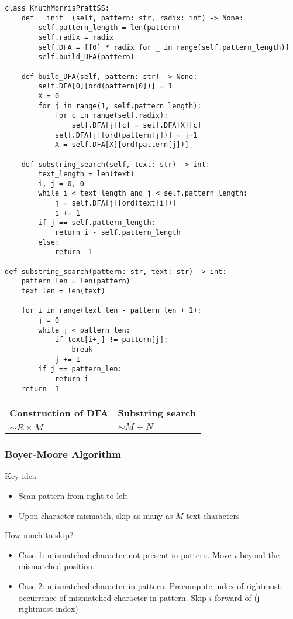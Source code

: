\documentclass[a4paper]{article}
\begin{document}
\begin{lstlisting}
class KnuthMorrisPrattSS:
    def __init__(self, pattern: str, radix: int) -> None:
        self.pattern_length = len(pattern)
        self.radix = radix
        self.DFA = [[0] * radix for _ in range(self.pattern_length)]
        self.build_DFA(pattern)

    def build_DFA(self, pattern: str) -> None:
        self.DFA[0][ord(pattern[0])] = 1
        X = 0
        for j in range(1, self.pattern_length):
            for c in range(self.radix):
                self.DFA[j][c] = self.DFA[X][c]
            self.DFA[j][ord(pattern[j])] = j+1
            X = self.DFA[X][ord(pattern[j])]

    def substring_search(self, text: str) -> int:
        text_length = len(text)
        i, j = 0, 0
        while i < text_length and j < self.pattern_length:
            j = self.DFA[j][ord(text[i])]
            i += 1
        if j == self.pattern_length:
            return i - self.pattern_length
        else:
            return -1
        
def substring_search(pattern: str, text: str) -> int:
    pattern_len = len(pattern)
    text_len = len(text)

    for i in range(text_len - pattern_len + 1):
        j = 0
        while j < pattern_len:
            if text[i+j] != pattern[j]:
                break
            j += 1
        if j == pattern_len:
            return i
    return -1
\end{lstlisting}

\begin{spacing}{1.5}
\begin{tabularx}{1\textwidth}{|X|X|}
    \hline
    \textbf{Construction of DFA} & \textbf{Substring search}\\
    \hline
    $\sim R\times M$&$\sim M+N$\\
    \hline
\end{tabularx}
\end{spacing}

\subsubsection*{Boyer-Moore Algorithm}
Key idea
\begin{itemize}
    \item Scan pattern from right to left
    \item Upon character mismatch, skip as many as $M$ text characters
\end{itemize}
How much to skip?
\begin{itemize}
    \item Case 1: mismatched character not present in pattern. Move $i$ beyond the mismatched position.
    \item Case 2: mismatched character in pattern. Precompute index of rightmost occurrence of mismatched character in pattern. Skip $i$ forward of (j - rightmost index)
\end{itemize}
\end{document}
